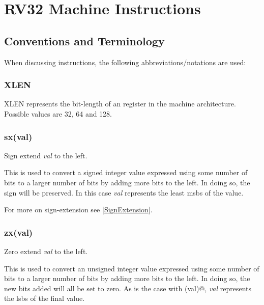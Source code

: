 
\newcommand\instructionHeader[1]{{\large\tt \string#1}}

\chapter{RV32 Machine Instructions}
\label{chapter:RV32}

\section{Conventions and Terminology}

When discussing instructions, the following abbreviations/notations are used:

\subsection{XLEN}
\label{XLEN}


XLEN represents the bit-length of an  register in the machine architecture.
Possible values are 32, 64 and 128.

\subsection{sx(val)}
\label{extension:sx}

Sign extend {\em val} to the left.

This is used to convert a signed integer value expressed using some number of 
bits to a larger number of bits by adding more bits to the left.  In doing so, 
the sign will be preserved.  In this case {\em val} represents the least 
\acrshort{msb}s of the value.  

For more on sign-extension see \autoref{SignExtension}.

\subsection{zx(val)}
\label{extension:zx}

Zero extend {\em val} to the left.

This is used to convert an unsigned integer value expressed using some number of 
bits to a larger number of bits by adding more bits to the left.  In doing so, 
the new bits added will all be set to zero.  As is the case with \verb@sx(val)@,
{\em val} represents the \acrshort{lsb}s of the final value.  

